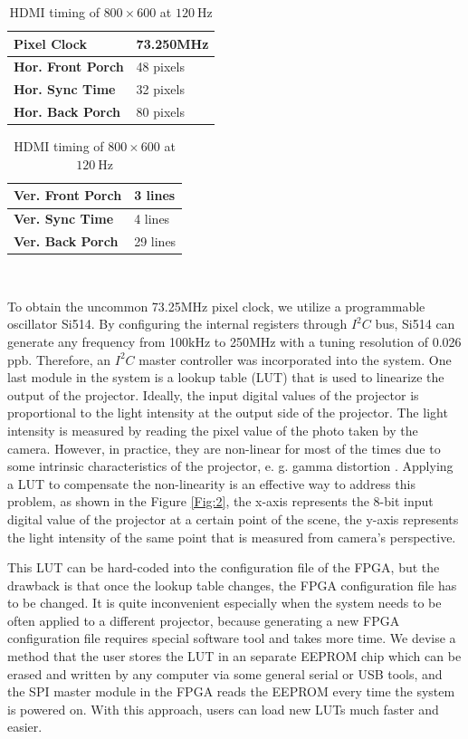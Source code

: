 \documentclass[]{spie}  %
\begin{document}
\begin{table}[!b]
\caption{HDMI timing of $800\times 600$ at $120~\mbox{Hz}$}
\label{Tab:2}
\parbox{.45\linewidth}{
\centering
\begin{tabular}{|l|l|}
\hline
\textbf{Pixel Clock} & 73.250MHz \\ \hline
\textbf{Hor. Front Porch} & 48 pixels \\ \hline
\textbf{Hor. Sync Time} & 32 pixels \\ \hline
\textbf{Hor. Back Porch} & 80 pixels \\ \hline
\end{tabular}}
\hfill
\parbox{.45\linewidth}{
\centering
\begin{tabular}{|l|l|}
\hline
\textbf{Ver. Front Porch} & 3 lines \\ \hline
\textbf{Ver. Sync Time} & 4 lines \\ \hline
\textbf{Ver. Back Porch} & 29 lines \\ \hline
\end{tabular}
}\\
\end{table}

To obtain the uncommon 73.25MHz pixel clock, we utilize a programmable oscillator Si514. By configuring the internal registers through $I^2C$ bus, Si514 can generate any frequency from 100kHz to 250MHz with a tuning resolution of 0.026 ppb. Therefore, an $I^2C$ master controller was incorporated into the system. One last module in the system is a lookup table (LUT) that is used to linearize the output of the projector. Ideally, the input digital values of the projector is proportional to the light intensity at the output side of the projector. The light intensity is measured by reading the pixel value of the photo taken by the camera. However, in practice, they are non-linear for most of the times due to some intrinsic characteristics of the projector, e. g. gamma distortion \cite{gamm10}. Applying a LUT to compensate the non-linearity is an effective way to address this problem, as shown in the Figure \ref{Fig:2}, the x-axis represents the 8-bit input digital value of the projector at a certain point of the scene, the y-axis represents the light intensity of the same point that is measured from camera's perspective.

This LUT can be hard-coded into the configuration file of the FPGA, but the drawback is that once the lookup table changes, the FPGA configuration file has to be changed. It is quite inconvenient especially when the system needs to be often applied to a different projector, because generating a new FPGA configuration file requires special software tool and takes more time. We devise a method that the user stores the LUT in an separate EEPROM chip which can be erased and written by any computer via some general serial or USB tools, and the SPI master module in the FPGA reads the EEPROM every time the system  is powered on. With this approach, users can load new LUTs much faster and easier.
\end{document}
